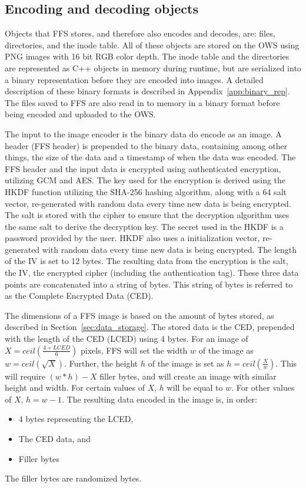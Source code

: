 \subsection{Encoding and decoding objects}
\label{subsec:file_enc_dec}
Objects that FFS stores, and therefore also encodes and decodes, are: files, directories, and the inode table. All of these objects are stored on the OWS using PNG images with 16 bit RGB color depth. The inode table and the directories are represented as C++ objects in memory during runtime, but are serialized into a binary representation before they are encoded into images. A detailed description of these binary formats is described in Appendix~\ref{app:binary_rep}. The files saved to FFS are also read in to memory in a binary format before being encoded and uploaded to the OWS. 

The input to the image encoder is the binary data do encode as an image. A header (FFS header) is prepended to the binary data, containing among other things, the size of the data and a timestamp of when the data was encoded. The FFS header and the input data is encrypted using authenticated encryption, utilizing GCM and AES. The key used for the encryption is derived using the HKDF function utilizing the SHA-256 hashing algorithm, along with a \SI{64}{\byte} salt vector, re-generated with random data every time new data is being encrypted. The salt is stored with the cipher to ensure that the decryption algorithm uses the same salt to derive the decryption key. The secret used in the HKDF is a password provided by the user. HKDF also uses a initialization vector, re-generated with random data every time new data is being encrypted. The length of the IV is set to 12 bytes. The resulting data from the encryption is the salt, the IV, the encrypted cipher (including the authentication tag). These three data points are concatenated into a string of bytes. This string of bytes is referred to as the Complete Encrypted Data (CED).

The dimensions of a FFS image is based on the amount of bytes stored, as described in Section~\ref{sec:data_storage}. The stored data is the CED, prepended with the length of the CED (LCED) using 4 bytes. For an image of $X = ceil(\frac{4 + LCED}{6})$ pixels, FFS will set the width $w$ of the image as $w = ceil(\sqrt{X})$. Further, the height $h$ of the image is set as $h = ceil(\frac{X}{w})$. This will require $(w * h) - X$ filler bytes, and will create an image with similar height and width. For certain values of $X$, $h$ will be equal to $w$. For other values of $X$, $h = w-1$. The resulting data encoded in the image is, in order:
\begin{itemize}
	\item 4 bytes representing the LCED,
	\item The CED data, and
	\item Filler bytes
\end{itemize}
The filler bytes are randomized bytes.

